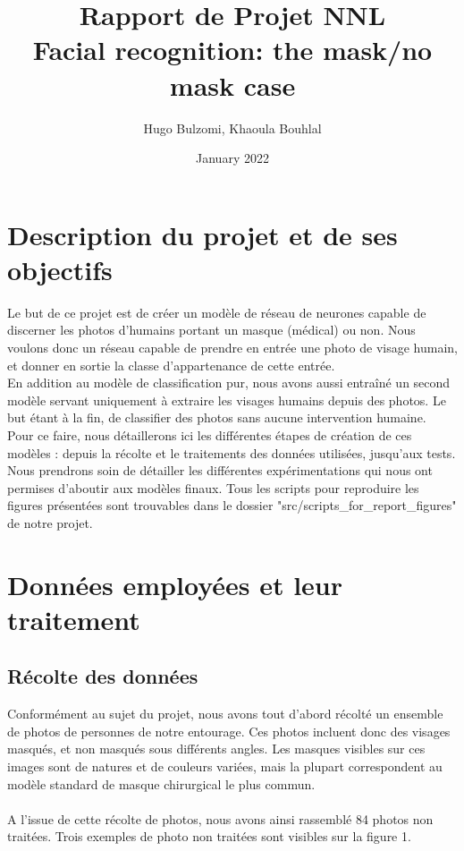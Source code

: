 \documentclass{article}
\title{Rapport de Projet NNL\\ Facial recognition: the mask/no mask case}
\author{Hugo Bulzomi, Khaoula Bouhlal}
\date{January 2022}
\begin{document}
\maketitle

\section{Description du projet et de ses objectifs}
Le but de ce projet est de créer un modèle de réseau de neurones capable de discerner les photos d'humains portant un masque (médical) ou non. Nous voulons donc un réseau capable de prendre en entrée une photo de visage humain, et donner en sortie la classe d'appartenance de cette entrée.\\
En addition au modèle de classification pur, nous avons aussi entraîné un second modèle servant uniquement à extraire les visages humains depuis des photos. Le but étant à la fin, de classifier des photos sans aucune intervention humaine. \\
Pour ce faire, nous détaillerons ici les différentes étapes de création de ces modèles : depuis la récolte et le traitements des données utilisées, jusqu'aux tests. Nous prendrons soin de détailler les différentes expérimentations qui nous ont permises d'aboutir aux modèles finaux. Tous les scripts pour reproduire les figures présentées sont trouvables dans le dossier "src/scripts\_for\_report\_figures" de notre projet.

\section{Données employées et leur traitement}
\subsection{Récolte des données}
Conformément au sujet du projet, nous avons tout d'abord récolté un ensemble de photos de personnes de notre entourage. Ces photos incluent donc des visages masqués, et non masqués sous différents angles. Les masques visibles sur ces images sont de natures et de couleurs variées, mais la plupart correspondent au modèle standard de masque chirurgical le plus commun.\\\\

A l'issue de cette récolte de photos, nous avons ainsi rassemblé 84 photos non traitées. Trois exemples de photo non traitées sont visibles sur la figure 1.
\end{document}
